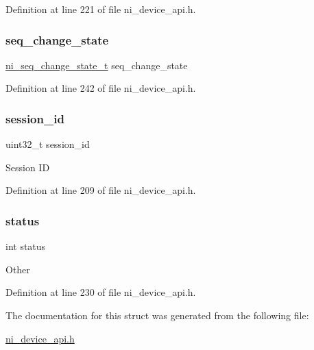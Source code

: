 Definition at line 221 of file ni\+\_\+device\+\_\+api.\+h.

\mbox{\label{struct__ni__session__context_a64ed8372b7bdc10e85c161c9e1c43d8e}} 
\subsubsection{\texorpdfstring{seq\_change\_state}{seq\_change\_state}}
{\footnotesize\ttfamily \mbox{\hyperlink{ni__device__api_8h_a139b7f0724b1c7ef7135df09e70eb814}{ni\+\_\+seq\+\_\+change\+\_\+state\+\_\+t}} seq\+\_\+change\+\_\+state}



Definition at line 242 of file ni\+\_\+device\+\_\+api.\+h.

\mbox{\label{struct__ni__session__context_a946f27f64a6c7500925f6d10c0b007aa}} 
\subsubsection{\texorpdfstring{session\_id}{session\_id}}
{\footnotesize\ttfamily uint32\+\_\+t session\+\_\+id}

Session ID 

Definition at line 209 of file ni\+\_\+device\+\_\+api.\+h.

\mbox{\label{struct__ni__session__context_a6e27f49150e9a14580fb313cc2777e00}} 
\subsubsection{\texorpdfstring{status}{status}}
{\footnotesize\ttfamily int status}

Other 

Definition at line 230 of file ni\+\_\+device\+\_\+api.\+h.



The documentation for this struct was generated from the following file\+:\begin{DoxyCompactItemize}
\item 
\mbox{\hyperlink{ni__device__api_8h}{ni\+\_\+device\+\_\+api.\+h}}\end{DoxyCompactItemize}
